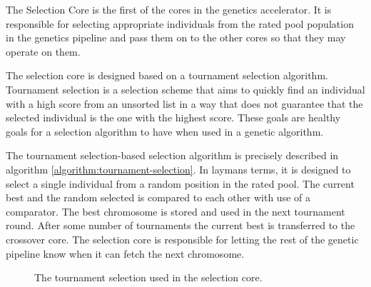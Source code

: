 The Selection Core is the first of the cores in the genetics accelerator.
It is responsible for selecting appropriate individuals from the rated pool population in the genetics pipeline and pass them on to the other cores so that they may operate on them.

The selection core is designed based on a tournament selection algorithm.
Tournament selection is a selection scheme that aims to quickly find an individual with a high score from an unsorted list in a way that does not guarantee that the selected individual is the one with the highest score.
These goals are healthy goals for a selection algorithm to have when used in a genetic algorithm.

The tournament selection-based selection algorithm is precisely described in algorithm \vref{algorithm:tournament-selection}.
In laymans terms, it is designed to select a single individual from a random position in the rated pool.
The current best and the random selected is compared to each other with use of a comparator.
The best chromosome is stored and used in the next tournament round.
After some number of tournaments the current best is transferred to the crossover core.
The selection core is responsible for letting the rest of the genetic pipeline know when it can fetch the next chromosome. 

\begin{figure}[H]
\begin{algorithm}[H]
\SetAlgoLined
\DontPrintSemicolon
{}
\caption{The tournament selection used in the selection core.}
\label{algorithm:tournament-selection}
\end{algorithm}
\end{figure}

